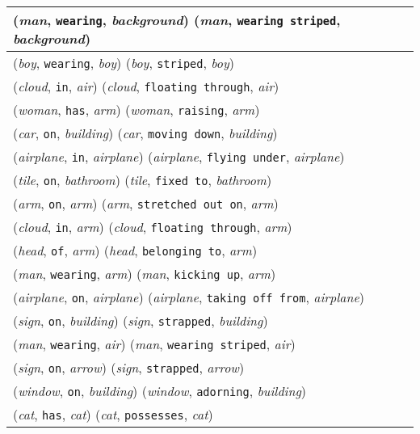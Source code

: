 \documentclass[runningheads]{llncs}
\begin{document}
{\begin{longtable}{ l }
(\textit{man}, \texttt{wearing}, \textit{background})  (\textit{man}, \texttt{wearing striped}, \textit{background}) \\ \hline
(\textit{boy}, \texttt{wearing}, \textit{boy})  (\textit{boy}, \texttt{striped}, \textit{boy}) \\ \hline
(\textit{cloud}, \texttt{in}, \textit{air})  (\textit{cloud}, \texttt{floating through}, \textit{air}) \\ \hline
(\textit{woman}, \texttt{has}, \textit{arm})  (\textit{woman}, \texttt{raising}, \textit{arm}) \\ \hline
(\textit{car}, \texttt{on}, \textit{building})  (\textit{car}, \texttt{moving down}, \textit{building}) \\ \hline
(\textit{airplane}, \texttt{in}, \textit{airplane})  (\textit{airplane}, \texttt{flying under}, \textit{airplane}) \\ \hline
(\textit{tile}, \texttt{on}, \textit{bathroom})  (\textit{tile}, \texttt{fixed to}, \textit{bathroom}) \\ \hline
(\textit{arm}, \texttt{on}, \textit{arm})  (\textit{arm}, \texttt{stretched out on}, \textit{arm}) \\ \hline
(\textit{cloud}, \texttt{in}, \textit{arm})  (\textit{cloud}, \texttt{floating through}, \textit{arm}) \\ \hline
(\textit{head}, \texttt{of}, \textit{arm})  (\textit{head}, \texttt{belonging to}, \textit{arm}) \\ \hline
(\textit{man}, \texttt{wearing}, \textit{arm})  (\textit{man}, \texttt{kicking up}, \textit{arm}) \\ \hline
(\textit{airplane}, \texttt{on}, \textit{airplane})  (\textit{airplane}, \texttt{taking off from}, \textit{airplane}) \\ \hline
(\textit{sign}, \texttt{on}, \textit{building})  (\textit{sign}, \texttt{strapped}, \textit{building}) \\ \hline
(\textit{man}, \texttt{wearing}, \textit{air})  (\textit{man}, \texttt{wearing striped}, \textit{air}) \\ \hline
(\textit{sign}, \texttt{on}, \textit{arrow})  (\textit{sign}, \texttt{strapped}, \textit{arrow}) \\ \hline
(\textit{window}, \texttt{on}, \textit{building})  (\textit{window}, \texttt{adorning}, \textit{building}) \\ \hline
(\textit{cat}, \texttt{has}, \textit{cat})  (\textit{cat}, \texttt{possesses}, \textit{cat}) \\ \hline

\end{longtable}}
\end{document}
